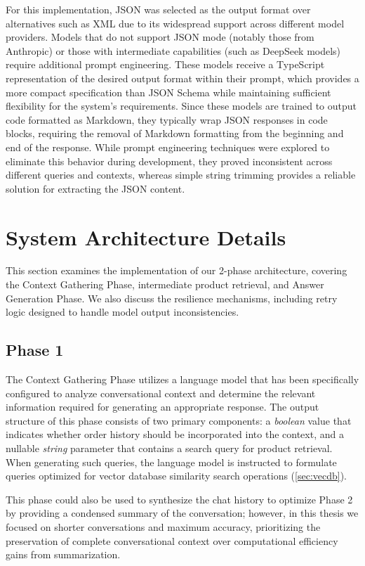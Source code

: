 For this implementation, JSON was selected as the output format over alternatives such as XML due to its widespread support across different model providers.
Models that do not support JSON mode (notably those from Anthropic) or those with intermediate capabilities (such as DeepSeek models) require additional prompt engineering.
These models receive a TypeScript representation of the desired output format within their prompt, which provides a more compact specification than JSON Schema while maintaining sufficient flexibility for the system's requirements.
Since these models are trained to output code formatted as Markdown, they typically wrap JSON responses in code blocks, requiring the removal of Markdown formatting from the beginning and end of the response.
While prompt engineering techniques were explored to eliminate this behavior during development, they proved inconsistent across different queries and contexts, whereas simple string trimming provides a reliable solution for extracting the JSON content.

\section{System Architecture Details}

This section examines the implementation of our 2-phase architecture, covering the Context Gathering Phase, intermediate product retrieval, and Answer Generation Phase. We also discuss the resilience mechanisms, including retry logic designed to handle model output inconsistencies.

\subsection{Phase 1}

The Context Gathering Phase utilizes a language model that has been specifically configured to analyze conversational context and determine the relevant information required for generating an appropriate response.
The output structure of this phase consists of two primary components: a \textit{boolean} value that indicates whether order history should be incorporated into the context, and a nullable \textit{string} parameter that contains a search query for product retrieval.
When generating such queries, the language model is instructed to formulate queries optimized for vector database similarity search operations (\cref{sec:vecdb}).

This phase could also be used to synthesize the chat history to optimize Phase 2 by providing a condensed summary of the conversation; however, in this thesis we focused on shorter conversations and maximum accuracy, prioritizing the preservation of complete conversational context over computational efficiency gains from summarization.

